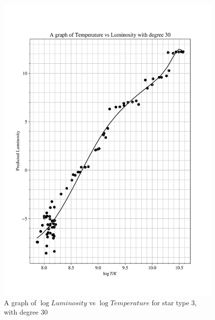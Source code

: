 \documentclass[12pt, a4paper]{article}
\begin{document}
\begin{figure}[H]
    \centering
    \includegraphics[width = \textwidth]{2Plot4_30.png}
    \caption{A graph of \(\log{Luminosity}\) vs \(\log{Temperature}\) for star type 3, with degree 30}
    \label{fig:Fig 2.11}
\end{figure}
\end{document}
